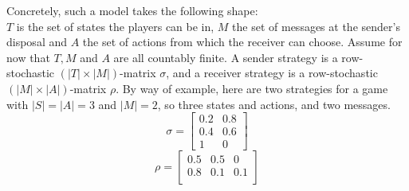 \documentclass{article}
\begin{document}
Concretely, such a model takes the following shape:\\
$T$ is the set of states the players can be in, $M$ the set of messages at the sender's disposal and $A$ the set of actions from which the receiver can choose. Assume for now that $T,M$ and $A$ are all countably finite. A sender strategy is a row-stochastic $(|T| \times |M|)$-matrix $\sigma$, and a receiver strategy is a row-stochastic $(|M|\times |A|)$-matrix $\rho$. By way of example, here are two strategies for a game with $|S|=|A|=3$ and $|M|=2$, so three states and actions, and two messages. \\
\begin{equation*}
\sigma =
\begin{bmatrix}
0.2 & 0.8 \\
0.4 & 0.6 \\
1 & 0
\end{bmatrix}
\end{equation*}
\begin{equation*}
\rho =
\begin{bmatrix}
0.5 & 0.5 & 0\\
0.8 & 0.1 & 0.1 \\
\end{bmatrix}
\end{equation*}
\end{document}
